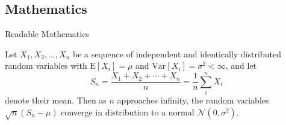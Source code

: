 \documentclass{beamer}
\begin{document}
\subsection{Mathematics}

\begin{frame}{Readable Mathematics}

Let $X_1, X_2, \ldots, X_n$ be a sequence of independent and identically distributed random variables with $\text{E}[X_i] = \mu$ and $\text{Var}[X_i] = \sigma^2 < \infty$, and let
$$S_n = \frac{X_1 + X_2 + \cdots + X_n}{n}
      = \frac{1}{n}\sum_{i}^{n} X_i$$
denote their mean. Then as $n$ approaches infinity, the random variables $\sqrt{n}(S_n - \mu)$ converge in distribution to a normal $\mathcal{N}(0, \sigma^2)$.

\end{frame}
\end{document}
